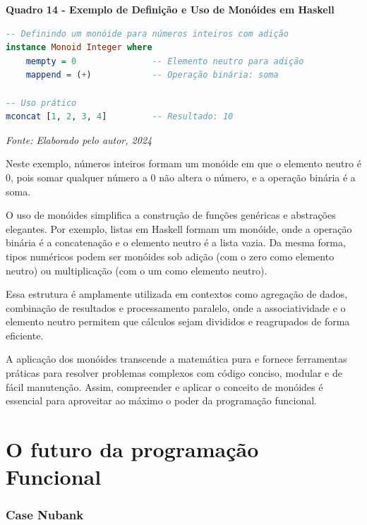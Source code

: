 \begin{center}
    \textbf{Quadro 14 - Exemplo de Definição e Uso de Monóides em Haskell}
\end{center}

\begin{tcolorbox}[colback=gray!5!white, colframe=gray!75!black, title=]
\begin{lstlisting}[language=Haskell]
-- Definindo um monóide para números inteiros com adição
instance Monoid Integer where
    mempty = 0               -- Elemento neutro para adição
    mappend = (+)            -- Operação binária: soma

-- Uso prático
mconcat [1, 2, 3, 4]         -- Resultado: 10
\end{lstlisting}
\end{tcolorbox}

\begin{center}
    \textit{Fonte: Elaborado pelo autor, 2024} 
\end{center}



Neste exemplo, números inteiros formam um monóide em que o elemento neutro é 0, pois somar qualquer número a 0 não altera o número, e a operação binária é a soma. 

O uso de monóides simplifica a construção de funções genéricas e abstrações elegantes. Por exemplo, listas em Haskell formam um monóide, onde a operação binária é a concatenação e o elemento neutro é a lista vazia. Da mesma forma, tipos numéricos podem ser monóides sob adição (com o zero como elemento neutro) ou multiplicação (com o um como elemento neutro).

Essa estrutura é amplamente utilizada em contextos como agregação de dados, combinação de resultados e processamento paralelo, onde a associatividade e o elemento neutro permitem que cálculos sejam divididos e reagrupados de forma eficiente.

A aplicação dos monóides transcende a matemática pura e fornece ferramentas práticas para resolver problemas complexos com código conciso, modular e de fácil manutenção. Assim, compreender e aplicar o conceito de monóides é essencial para aproveitar ao máximo o poder da programação funcional.


\chapter{O futuro da programação Funcional}

\subsection{Case Nubank}

